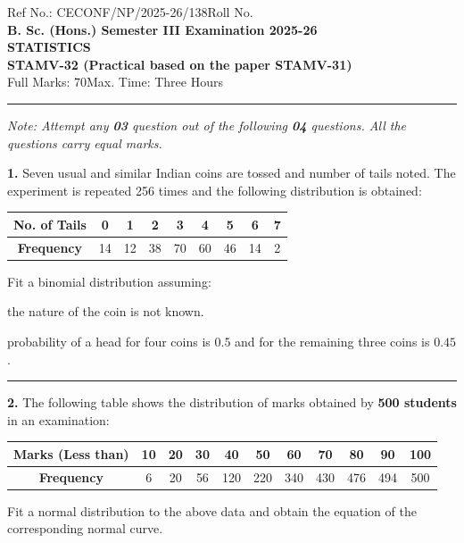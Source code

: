 \documentclass[11pt,a4paper]{article}
\begin{document}
\begin{center}
  \small Ref No.: CECONF/NP/2025-26/138\hfill Roll No. \underline{\hspace{4cm}}\\[6pt]
  {\large\bfseries B. Sc. (Hons.) Semester III Examination 2025-26}\\[4pt]
  {\large\bfseries STATISTICS}\\[4pt]
  {\large\bfseries STAMV-32 (Practical based on the paper STAMV-31)}\\[4pt]
  {\normalsize Full Marks: 70\hfill Max. Time: Three Hours}
\end{center}

\rule{\linewidth}{0.4pt}\smallskip



\noindent   \textit{Note: Attempt any   \textbf{03} question out of the following   \textbf{04} questions. All the questions carry equal marks.}
\bigskip




\noindent   \textbf{1.} Seven usual and similar Indian coins are tossed and number of tails noted. The experiment is repeated 256 times and the following distribution is obtained:

\begin{center}

\begin{tabular}{|c|c|c|c|c|c|c|c|c|}
\hline
   \textbf{No. of Tails} & 0 & 1 & 2 & 3 & 4 & 5 & 6 & 7 \\
\hline
   \textbf{Frequency} & 14 & 12 & 38 & 70 & 60 & 46 & 14 & 2 \\
\hline
\end{tabular}
\end{center}
Fit a binomial distribution assuming:

\begin{parts}
  \item the nature of the coin is not known.
  \item probability of a head for four coins is $0.5$ and for the remaining three coins is $0.45$.
\end{parts}

\medskip\rule{\linewidth}{0.2pt}\medskip




\noindent   \textbf{2.} The following table shows the distribution of marks obtained by   \textbf{500 students} in an examination:

\begin{center}

\begin{tabular}{|c|c|c|c|c|c|c|c|c|c|c|}
\hline
   \textbf{Marks (Less than)} & 10 & 20 & 30 & 40 & 50 & 60 & 70 & 80 & 90 & 100 \\
\hline
   \textbf{Frequency} & 6 & 20 & 56 & 120 & 220 & 340 & 430 & 476 & 494 & 500 \\
\hline
\end{tabular}
\end{center}
Fit a normal distribution to the above data and obtain the equation of the corresponding normal curve.
\end{document}
